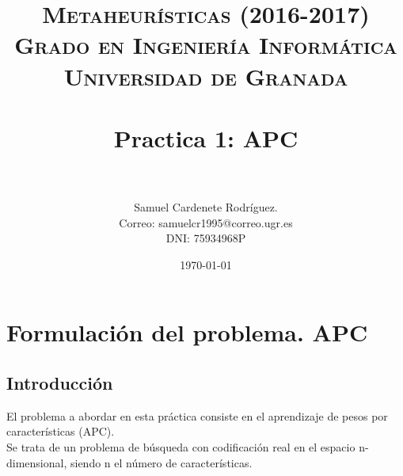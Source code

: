 





\title{	
\normalfont \normalsize 
\textsc{\textbf{Metaheurísticas (2016-2017)} \\ Grado en Ingeniería Informática \\ Universidad de Granada} \\ [25pt] %
\horrule{0.5pt} \\[0.4cm] %
\huge Practica 1: APC \\ %
\horrule{2pt} \\[0.5cm] %
}

\author{Samuel Cardenete Rodríguez.  \\Correo: samuelcr1995@correo.ugr.es \\ DNI: 75934968P} %

\date{\normalsize\today} %




\maketitle %

\newpage %

\tableofcontents %

\listoffigures



\newpage





\section{Formulación del problema. APC}

\subsection{Introducción}
El problema a abordar en esta práctica consiste en el aprendizaje de pesos por características (APC). \\ 
Se trata de un problema de búsqueda con codificación real en el espacio n-dimensional, siendo n el número de características.\\ 

